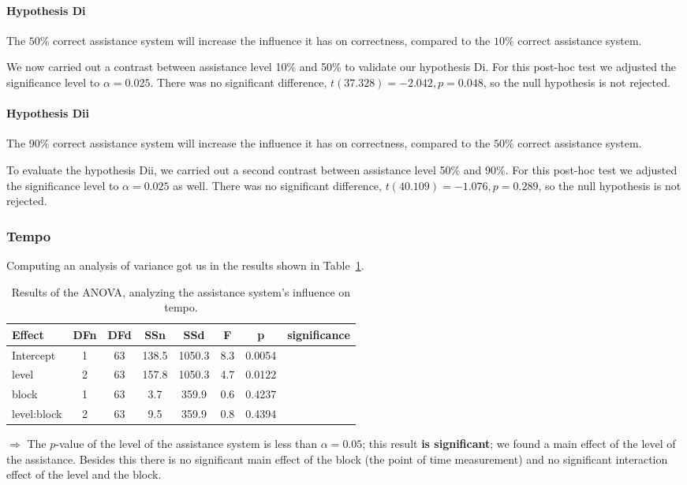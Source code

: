 		\paragraph{Hypothesis Di}
		\lqq The \(50\%\) correct assistance system will increase the influence it has on correctness, compared to the \(10\%\) correct assistance system.\rqq

		We now carried out a contrast between assistance level 10\% and 50\% to validate our hypothesis Di. For this post-hoc test we adjusted the significance level to \(\alpha = 0.025\). There was no significant difference, \(t(37.328) = -2.042, p = 0.048\), so the null hypothesis is not rejected.

		\paragraph{Hypothesis Dii}
		\lqq The \(90\%\) correct assistance system will increase the influence it has on correctness, compared to the \(50\%\) correct assistance system.\rqq

		To evaluate the hypothesis Dii, we carried out a second contrast between assistance level 50\% and 90\%. For this post-hoc test we adjusted the significance level to \(\alpha = 0.025\) as well. There was no significant difference, \(t(40.109) = -1.076, p = 0.289\), so the null hypothesis is not rejected.



	\subsubsection{Tempo}
		Computing an analysis of variance got us in the results shown in Table~\ref{tab:anovaTempo}.

		\begin{table}[H]\centering
			\caption{Results of the \ac{ANOVA}, analyzing the assistance system's influence on tempo.}
			\begin{tabular}{lccccccc}
				\toprule
				Effect & DFn & DFd & SSn & SSd & F & p & significance \\
				\midrule
				Intercept 	& 1 & 63 & 138.5 & 1050.3 & 8.3 & 0.0054 & \Checkmark \\
				level				& 2 & 63 & 157.8 & 1050.3 & 4.7  & 0.0122 & \Checkmark \\
				block 			& 1 & 63 & 3.7  & 359.9 & 0.6  & 0.4237 & \XSolidBrush \\
				level:block & 2 & 63 & 9.5 & 359.9 & 0.8 	& 0.4394 & \XSolidBrush \\
				\bottomrule
			\end{tabular}
			\label{tab:anovaTempo}
		\end{table}
		\(\Rightarrow\) The \(p\)-value of the level of the assistance system is less than \(\alpha = 0.05\); this result \textbf{is significant}; we found a main effect of the level of the assistance. Besides this there is no significant main effect of the block (the point of time measurement) and no significant interaction effect of the level and the block.


